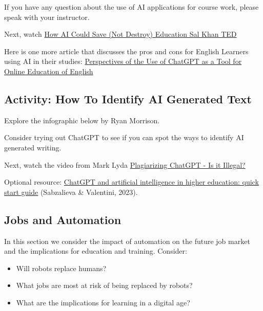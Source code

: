 \documentclass[
]{book}
\providecommand{\tightlist}{%
  \setlength{\itemsep}{0pt}\setlength{\parskip}{0pt}}
\theoremstyle{definition}
\theoremstyle{definition}
\theoremstyle{definition}
\theoremstyle{definition}
\theoremstyle{remark}
\begin{document}
\begin{reflect}
If you have any question about the use of AI applications for course work, please speak with your instructor.

Next, watch \href{https://www.youtube.com/watch?v=hJP5GqnTrNo}{How AI Could Save (Not Destroy) Education \textbar{} Sal Khan \textbar{} TED}

Here is one more article that discusses the pros and cons for English Learners using AI in their studies: \href{https://www.researchgate.net/publication/374483468_Perspectives_of_the_Use_of_ChatGPT_as_a_Tool_for_Online_Education_of_English}{Perspectives of the Use of ChatGPT as a Tool for Online Education of English}
\end{reflect}

\hypertarget{activity-how-to-identify-ai-generated-text}{%
\subsection*{Activity: How To Identify AI Generated Text}\label{activity-how-to-identify-ai-generated-text}}

\begin{reflect}
Explore the infographic below by Ryan Morrison.

Consider trying out ChatGPT to see if you can spot the ways to identify AI generated writing.

Next, watch the video from Mark Lyda \href{https://www.youtube.com/watch?v=zuvN8_6QIKk}{Plagiarizing ChatGPT - Is it Illegal?}

Optional resource: \href{https://www.iesalc.unesco.org/wp-content/uploads/2023/04/ChatGPT-and-Artificial-Intelligence-in-higher-education-Quick-Start-guide_EN_FINAL.pdf}{ChatGPT and artificial intelligence in higher education: quick start guide} (Sabzalieva \& Valentini, 2023).
\end{reflect}

\hypertarget{jobs-and-automation}{%
\subsection*{Jobs and Automation}\label{jobs-and-automation}}

In this section we consider the impact of automation on the future job market and the implications for education and training. Consider:

\begin{itemize}
\tightlist
\item
  Will robots replace humans?\\
\item
  What jobs are most at risk of being replaced by robots?\\
\item
  What are the implications for learning in a digital age?
\end{itemize}
\end{document}
